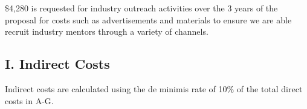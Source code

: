 \$4,280 is requested for industry outreach activities over the 3 years of the proposal for costs such as advertisements and materials to ensure we are able recruit industry mentors through a variety of channels.

\subsection{I. Indirect Costs}
Indirect costs are calculated using the de minimis rate of 10\% of the total direct costs in A-G.